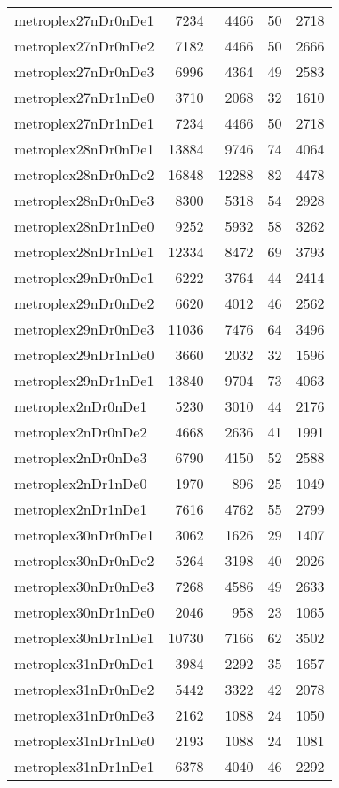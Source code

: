 \begin{longtable}{lrrrr}
metroplex27nDr0nDe1 & 7234 & 4466 & 50 & 2718 \\
metroplex27nDr0nDe2 & 7182 & 4466 & 50 & 2666 \\
metroplex27nDr0nDe3 & 6996 & 4364 & 49 & 2583 \\
metroplex27nDr1nDe0 & 3710 & 2068 & 32 & 1610 \\
metroplex27nDr1nDe1 & 7234 & 4466 & 50 & 2718 \\
metroplex28nDr0nDe1 & 13884 & 9746 & 74 & 4064 \\
metroplex28nDr0nDe2 & 16848 & 12288 & 82 & 4478 \\
metroplex28nDr0nDe3 & 8300 & 5318 & 54 & 2928 \\
metroplex28nDr1nDe0 & 9252 & 5932 & 58 & 3262 \\
metroplex28nDr1nDe1 & 12334 & 8472 & 69 & 3793 \\
metroplex29nDr0nDe1 & 6222 & 3764 & 44 & 2414 \\
metroplex29nDr0nDe2 & 6620 & 4012 & 46 & 2562 \\
metroplex29nDr0nDe3 & 11036 & 7476 & 64 & 3496 \\
metroplex29nDr1nDe0 & 3660 & 2032 & 32 & 1596 \\
metroplex29nDr1nDe1 & 13840 & 9704 & 73 & 4063 \\
metroplex2nDr0nDe1 & 5230 & 3010 & 44 & 2176 \\
metroplex2nDr0nDe2 & 4668 & 2636 & 41 & 1991 \\
metroplex2nDr0nDe3 & 6790 & 4150 & 52 & 2588 \\
metroplex2nDr1nDe0 & 1970 & 896 & 25 & 1049 \\
metroplex2nDr1nDe1 & 7616 & 4762 & 55 & 2799 \\
metroplex30nDr0nDe1 & 3062 & 1626 & 29 & 1407 \\
metroplex30nDr0nDe2 & 5264 & 3198 & 40 & 2026 \\
metroplex30nDr0nDe3 & 7268 & 4586 & 49 & 2633 \\
metroplex30nDr1nDe0 & 2046 & 958 & 23 & 1065 \\
metroplex30nDr1nDe1 & 10730 & 7166 & 62 & 3502 \\
metroplex31nDr0nDe1 & 3984 & 2292 & 35 & 1657 \\
metroplex31nDr0nDe2 & 5442 & 3322 & 42 & 2078 \\
metroplex31nDr0nDe3 & 2162 & 1088 & 24 & 1050 \\
metroplex31nDr1nDe0 & 2193 & 1088 & 24 & 1081 \\
metroplex31nDr1nDe1 & 6378 & 4040 & 46 & 2292 \\

\end{longtable}
